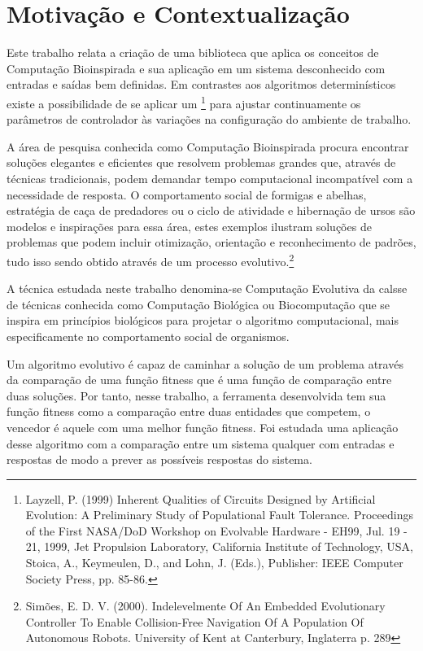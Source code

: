 \section{Motivação e Contextualização}

\newcommand\SistemaEvolutivo{\sigla{SE}{Sistema Evolutivo}}

Este trabalho relata a criação de uma biblioteca que aplica os conceitos de Computação Bioinspirada e sua aplicação em um sistema desconhecido com entradas e saídas bem definidas. Em contrastes aos algoritmos determinísticos existe a possibilidade de se aplicar um \SistemaEvolutivo\footnote{Layzell, P. (1999) Inherent Qualities of Circuits Designed by Artificial Evolution: A Preliminary Study of Populational Fault Tolerance. Proceedings of the First NASA/DoD Workshop on Evolvable Hardware - EH99, Jul. 19 - 21, 1999, Jet Propulsion Laboratory, California Institute of Technology, USA, Stoica, A., Keymeulen, D., and Lohn, J. (Eds.), Publisher: IEEE Computer Society Press, pp. 85-86.} para ajustar continuamente os parâmetros de controlador às variações na configuração do ambiente de trabalho.

A área de pesquisa conhecida como Computação Bioinspirada procura encontrar soluções elegantes e eficientes que resolvem problemas grandes que, através de técnicas tradicionais, podem demandar tempo computacional incompatível com a necessidade de resposta. O comportamento social de formigas e abelhas, estratégia de caça de predadores ou o ciclo de atividade e hibernação de ursos são modelos e inspirações para essa área, estes exemplos ilustram soluções de problemas que podem incluir otimização, orientação e reconhecimento de padrões, tudo isso sendo obtido através de um processo evolutivo.\footnote{Simões, E. D. V. (2000). Indelevelmente Of An Embedded Evolutionary Controller To Enable Collision-Free Navigation Of A Population Of Autonomous Robots. University of Kent at Canterbury, Inglaterra p. 289}

A técnica estudada neste trabalho denomina-se Computação Evolutiva da calsse de técnicas conhecida como Computação Biológica ou Biocomputação que se inspira em princípios biológicos para projetar o algoritmo computacional, mais especificamente no comportamento social de organismos.

Um algoritmo evolutivo é capaz de caminhar a solução de um problema através da comparação de uma função fitness que é uma função de comparação entre duas soluções. Por tanto, nesse trabalho, a ferramenta desenvolvida tem sua função fitness como a comparação entre duas entidades que competem, o vencedor é aquele com uma melhor função fitness. Foi estudada uma aplicação desse algoritmo com a comparação entre um sistema qualquer com entradas e respostas de modo a prever as possíveis respostas do sistema.

